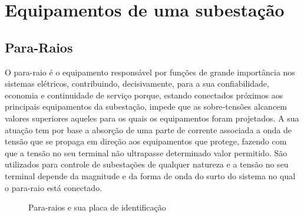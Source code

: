 \documentclass[a5paper,english,spanish,brazil]{ufsc-thesis}
\begin{document}
\section{Equipamentos de uma subestação}
\subsection{Para-Raios}
O para-raio é o equipamento responsável por funções de grande importância nos sistemas elétricos, contribuindo, decisivamente, para a sua confiabilidade, economia e continuidade de serviço porque, estando conectados próximos aos principais equipamentos da subestação, impede que as sobre-tensões alcancem valores superiores aqueles para os quais os equipamentos foram projetados. A sua atuação tem por base a absorção de uma parte de corrente associada a onda de tensão que se propaga em direção aos equipamentos que protege, fazendo com que a tensão no seu terminal não ultrapasse determinado valor permitido. São utilizados para controle de subestações de qualquer natureza e a tensão no seu terminal depende da magnitude e da forma de onda do surto do sistema no qual o para-raio está conectado.
\begin{figure}[htb]
  \caption{Para-raios e sua placa de identificação}
  \centering
\end{figure}
\end{document}
